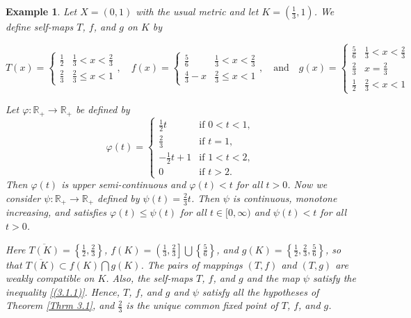 \documentclass[a4paper,12pt,oneside]{article}
\newtheorem{example}[theorem]{Example}
\numberwithin{equation}{section}
\begin{document}
\begin{example}
    
Let $X = (0,1)$ with the usual metric and let $K = \left( \frac{1}{3}, 1 \right)$. We define self-maps $T$, $f$, and $g$ on $K$ by

 \[
    T(x) = \begin{cases} 
        \frac{1}{2} & \frac{1}{3} < x < \frac{2}{3} \\
        \frac{2}{3} & \frac{2}{3} \leq x < 1 
    \end{cases}, \quad
    f(x) = \begin{cases} 
        \frac{5}{6} & \frac{1}{3} < x < \frac{2}{3} \\
        \frac{4}{3} - x & \frac{2}{3} \leq x < 1 
    \end{cases}, \quad \text{and} \quad
    g(x) = \begin{cases} 
        \frac{5}{6} & \frac{1}{3} < x < \frac{2}{3} \\
        \frac{2}{3} & x = \frac{2}{3} \\
        \frac{1}{2} & \frac{2}{3} < x < 1 
    \end{cases}
    \]

Let \(\varphi: \mathbb{R}_{+} \to \mathbb{R}_{+}\) be defined by
\[
\varphi(t) = 
\begin{cases}
\frac{1}{2}t & \text{if } 0 < t < 1, \\
\frac{2}{3} & \text{if } t = 1, \\
-\frac{1}{2}t + 1 & \text{if } 1 < t < 2, \\
0 & \text{if } t > 2.
\end{cases}
\]
Then \(\varphi(t)\) is upper semi-continuous and \(\varphi(t) < t\) for all \(t > 0\). Now we consider \(\psi: \mathbb{R}_{+} \to \mathbb{R}_{+}\) defined by \(\psi(t) = \frac{2}{3}t\). Then \(\psi\) is continuous, monotone increasing, and satisfies \(\varphi(t) \leq \psi(t)\) for all \(t \in [0, \infty)\) and \(\psi(t) < t\) for all \(t > 0\).

Here \(\overline{T(K)} = \left\{\frac{1}{2}, \frac{2}{3}\right\}\), \(f(K) = \left(\frac{1}{3}, \frac{2}{3}\right] \bigcup \left\{\frac{5}{6}\right\}\), and \(g(K) = \left\{\frac{1}{2}, \frac{2}{3}, \frac{5}{6}\right\}\), so that \(\overline{T(K)} \subset f(K) \bigcap g(K)\). The pairs of mappings \((T,f)\) and \((T,g)\) are weakly compatible on \(K\). Also, the self-maps \(T\), \(f\), and \(g\) and the map \(\psi\) satisfy the inequality \eqref{(3.1.1)}. Hence, \(T\), \(f\), and \(g\) and \(\psi\) satisfy all the hypotheses of Theorem \eqref{Thrm 3.1}, and \(\frac{2}{3}\) is the unique common fixed point of \(T\), \(f\), and \(g\).
\end{example}
\end{document}
